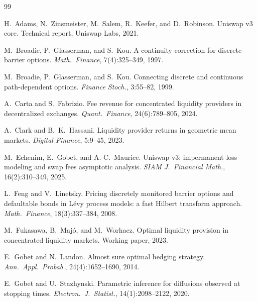 \documentclass[11pt]{article}
\theoremstyle{definition}
\theoremstyle{remark}
\begin{document}

\begin{thebibliography}{99}

H.~Adams, N.~Zinsmeister, M.~Salem, R.~Keefer, and D.~Robinson.
\newblock Uniswap v3 core.
\newblock Technical report, Uniswap Labs, 2021.

M.~Broadie, P.~Glasserman, and S.~Kou.
\newblock A continuity correction for discrete barrier options.
\newblock \emph{Math.\ Finance}, 7(4):325--349, 1997.

M.~Broadie, P.~Glasserman, and S.~Kou.
\newblock Connecting discrete and continuous path-dependent options.
\newblock \emph{Finance Stoch.}, 3:55--82, 1999.

A.~Carta and S.~Fabrizio.
\newblock Fee revenue for concentrated liquidity providers in
  decentralized exchanges.
\newblock \emph{Quant.\ Finance}, 24(6):789--805, 2024.

A.~Clark and B.~K.~Hassani.
\newblock Liquidity provider returns in geometric mean markets.
\newblock \emph{Digital Finance}, 5:9--45, 2023.

M.~Echenim, E.~Gobet, and A.-C.~Maurice.
\newblock Uniswap v3: impermanent loss modeling and swap fees asymptotic
  analysis.
\newblock \emph{SIAM J.\ Financial Math.}, 16(2):310--349, 2025.

L.~Feng and V.~Linetsky.
\newblock Pricing discretely monitored barrier options and defaultable
  bonds in {L}\'evy process models: a fast {H}ilbert transform approach.
\newblock \emph{Math.\ Finance}, 18(3):337--384, 2008.

M.~Fukasawa, B.~Maj\'o, and M.~Worhacz.
\newblock Optimal liquidity provision in concentrated liquidity markets.
\newblock Working paper, 2023.

E.~Gobet and N.~Landon.
\newblock Almost sure optimal hedging strategy.
\newblock \emph{Ann.\ Appl.\ Probab.}, 24(4):1652--1690, 2014.

E.~Gobet and U.~Stazhynski.
\newblock Parametric inference for diffusions observed at stopping times.
\newblock \emph{Electron.\ J.\ Statist.}, 14(1):2098--2122, 2020.


\end{thebibliography}
\end{document}
